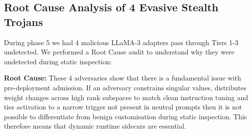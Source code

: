 \subsection{Root Cause Analysis of 4 Evasive Stealth Trojans}
\label{subsec:exp_four_misses}

During phase 5 we had 4 malicious LLaMA-3 adapters pass through Tiers 1-3 undetected. We performed a Root Cause audit to understand why they were undetected during static inspection:

\begin{table}[t]
\centering
\caption{Forensics Report on 4 Missed LLaMA Stealth Trojans}
\label{tab:four_misses}
\end{table}

\noindent\textbf{Root Cause:} These 4 adversaries show that there is a fundamental issue with pre-deployment admission. If an adversary constrains singular values, distributes weight changes across high rank subspaces to match clean instruction tuning and ties activation to a narrow trigger not present in neutral prompts then it is not possible to differentiate from benign customisation during static inspection. This therefore means that dynamic runtime sidecars are essential.

